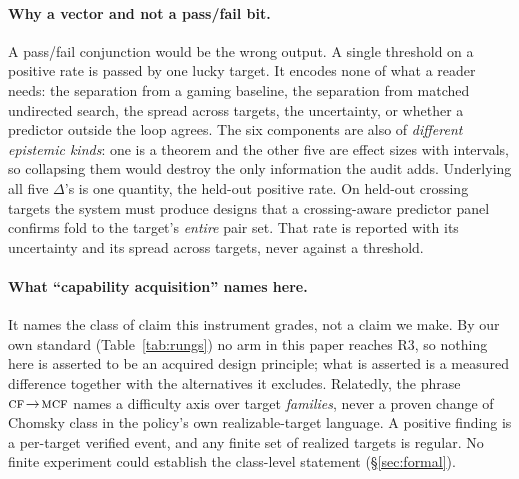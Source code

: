 \documentclass[11pt]{article}
\newcommand{\CF}{\textsc{cf}}
\newcommand{\MCF}{\textsc{mcf}}
\begin{document}
\paragraph{Why a vector and not a pass/fail bit.} A pass/fail conjunction would be the wrong output. A single threshold on a positive rate is passed by one lucky target. It encodes none of what a reader needs: the
separation from a gaming baseline, the separation from matched undirected search, the spread across targets, the
uncertainty, or whether a predictor outside the loop agrees. The six components are also of \emph{different
epistemic kinds}: one is a theorem and the other five are effect sizes with intervals, so collapsing them
would destroy the only information the audit adds. Underlying all five $\Delta$'s is one quantity, the held-out positive rate. On held-out crossing targets the
system must produce designs that a crossing-aware predictor panel confirms fold to the target's \emph{entire}
pair set. That rate is reported with its uncertainty and its spread across targets, never against a threshold.

\paragraph{What ``capability acquisition'' names here.} It names the class of claim this instrument grades,
not a claim we make. By our own standard (Table~\ref{tab:rungs}) no arm in this paper reaches R3, so nothing
here is asserted to be an acquired design principle; what is asserted is a measured difference together with
the alternatives it excludes. Relatedly, the phrase $\CF\!\to\!\MCF$ names a difficulty axis over target \emph{families}, never a proven
change of Chomsky class in the policy's own realizable-target language. A positive finding is a per-target
verified event, and any finite set of realized targets is regular. No finite experiment could establish the
class-level statement (\S\ref{sec:formal}).
\end{document}
